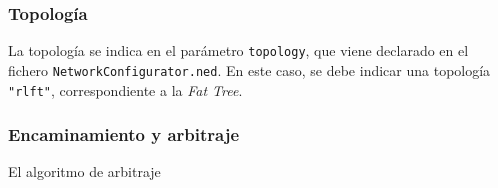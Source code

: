 \subsubsection{Topología}
La topología se indica en el parámetro \verb|topology|, que viene declarado en el fichero \verb|NetworkConfigurator.ned|. En este caso, se debe indicar una topología \verb|"rlft"|, correspondiente a la \emph{Fat Tree}.

\subsubsection{Encaminamiento y arbitraje}
El algoritmo de arbitraje 